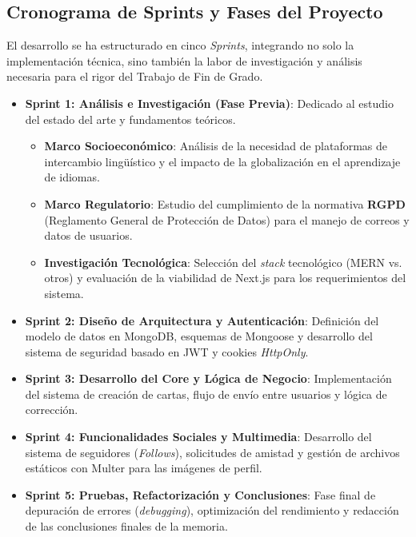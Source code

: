 \subsection{Cronograma de Sprints y Fases del Proyecto}

El desarrollo se ha estructurado en cinco \textit{Sprints}, integrando no solo la implementación técnica, sino también la labor de investigación y análisis necesaria para el rigor del Trabajo de Fin de Grado.

\begin{itemize}
    \item \textbf{Sprint 1: Análisis e Investigación (Fase Previa)}:
    Dedicado al estudio del estado del arte y fundamentos teóricos.
    \begin{itemize}
        \item \textbf{Marco Socioeconómico}: Análisis de la necesidad de plataformas de intercambio lingüístico y el impacto de la globalización en el aprendizaje de idiomas.
        \item \textbf{Marco Regulatorio}: Estudio del cumplimiento de la normativa \textbf{RGPD} (Reglamento General de Protección de Datos) para el manejo de correos y datos de usuarios.
        \item \textbf{Investigación Tecnológica}: Selección del \textit{stack} tecnológico (MERN vs. otros) y evaluación de la viabilidad de Next.js para los requerimientos del sistema.
    \end{itemize}

    \item \textbf{Sprint 2: Diseño de Arquitectura y Autenticación}:
    Definición del modelo de datos en MongoDB, esquemas de Mongoose y desarrollo del sistema de seguridad basado en JWT y cookies \textit{HttpOnly}.

    \item \textbf{Sprint 3: Desarrollo del Core y Lógica de Negocio}:
    Implementación del sistema de creación de cartas, flujo de envío entre usuarios y lógica de corrección.

    \item \textbf{Sprint 4: Funcionalidades Sociales y Multimedia}:
    Desarrollo del sistema de seguidores (\textit{Follows}), solicitudes de amistad y gestión de archivos estáticos con Multer para las imágenes de perfil.

    \item \textbf{Sprint 5: Pruebas, Refactorización y Conclusiones}:
    Fase final de depuración de errores (\textit{debugging}), optimización del rendimiento y redacción de las conclusiones finales de la memoria.
\end{itemize}